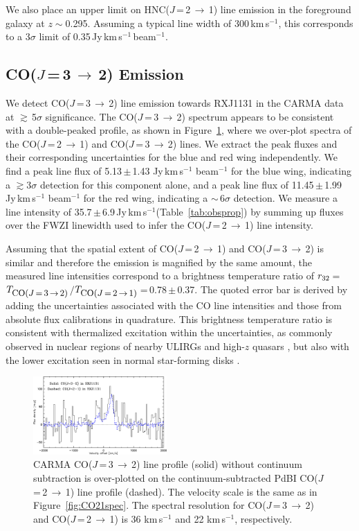 \documentclass[]{emulateapj}
\newcommand{\rarr}{$\rightarrow$}
\newcommand{\bco}{\mbox{CO($J$\,=\,2\,\rarr\,1)}\xspace}
\newcommand{\cco}{\mbox{CO($J$\,=\,3\,\rarr\,2)}\xspace}
\newcommand{\rot}[3][CO]{\mbox{#1($J$\,=\,#2\,\rarr\,#3)}}
\newcommand{\kms}{\mbox{km\,s$^{-1}$}\xspace}
\newcommand{\pmOne}{\mbox{$^{-1}$}\xspace}
\newcommand{\pmm}{\,$\pm$\,}
\newcommand{\Fig}[1]{Figure~\ref{fig:#1}}
\newcommand{\Tab}[1]{Table~\ref{tab:#1}}
\begin{document}
We also place an upper limit on \rot[HNC]{2}{1} line emission
in the foreground galaxy at $z\sim$0.295.
Assuming a typical line width of 300\,\kms, this corresponds to a 3$\sigma$
limit of 0.35\,Jy\,\kms\,beam\pmOne.

\subsection{\cco Emission}
We detect \cco line emission towards RXJ1131 in the CARMA data at $\gtrsim$\,5$\sigma$ significance.
The \cco spectrum appears to be consistent with a double-peaked profile, as shown in \Fig{co32spec}, where
we over-plot spectra of the \bco and \cco lines.
We extract the peak fluxes and their corresponding uncertainties for the blue and red wing independently.
We find a peak line flux of 5.13\pmm1.43 Jy\,\kms beam\pmOne for the blue wing, indicating a $\gtrsim$3$\sigma$ detection for this component alone, and a peak line flux of 11.45\pmm1.99\,Jy\,\kms beam\pmOne for the red wing,
indicating a $\sim$\,6$\sigma$ detection.
We measure a line intensity of 35.7\,$\pm$\,6.9\,Jy\,\kms (\Tab{obsprop}) by summing up fluxes over the FWZI
linewidth used to infer the \bco line intensity.

Assuming that the spatial extent of \bco and \cco is similar and therefore the emission is
magnified by the same amount, the measured line intensities
correspond to a brightness temperature ratio of
$r_{\rm 32}$\,=\,$T_{\small \cco}$$/$$T_{\small \bco}$\,=\,0.78\,$\pm$\,0.37.
The quoted error bar is derived by adding the uncertainties associated with the CO line intensities
and those from absolute flux calibrations in quadrature.
This brightness temperature ratio is consistent with
thermalized excitation within the uncertainties, as commonly observed in nuclear regions of
nearby ULIRGs and high-$z$ quasars \citep[e.g.,][]{Weiss07a, Riechers11b, CW13}, but also
with the lower excitation seen in normal star-forming disks \citep[e.g.,][]{Dannerbauer09a, CW13, Daddi15a}.

\begin{figure}[!htbp]
\includegraphics[width=0.455\textwidth]{f3.eps}
\caption{CARMA \cco line profile (solid) without continuum subtraction is
over-plotted on the continuum-subtracted PdBI \bco line profile (dashed).
The velocity scale is the same as in \Fig{CO21spec}.
The spectral resolution for \cco and \bco
is 36 \kms and 22 \kms, respectively.
\label{fig:co32spec}}
\end{figure}
\end{document}
